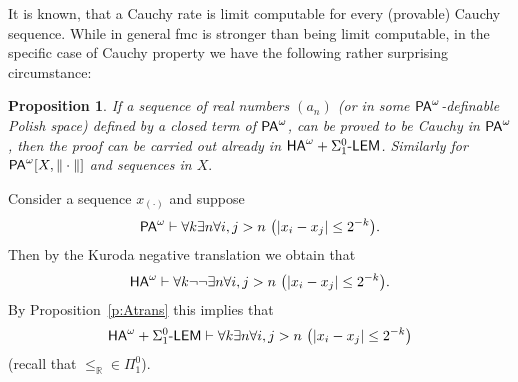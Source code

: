 \documentclass[1p]{elsarticle}
\newcommand{\usftext}[1]{\textsf{\upshape #1}}
\newcommand{\RR}{\ensuremath{\mathbb{R}}}
\newcommand{\ha}{\ensuremath{{\usftext{HA}}^\omega}} %
\newcommand{\pa}{\ensuremath{{\usftext{PA}}^\omega}} %
\newcommand{\LEM}{\ensuremath{\Sigma^0_1\usftext{-LEM}}}
\theoremstyle{plain}
\newtheorem{prop}[thm]{Proposition}
\theoremstyle{definition}
\theoremstyle{remark}
\renewenvironment{proof}[1][]{\noindent{\bf Proof{#1}. }}{\nopagebreak[4]{\hspace*{\fill}
  $\Box$              %
 }{\vspace{2ex}}}
\theoremstyle{definition}
\begin{document}
{It is known, that a Cauchy rate is limit computable for every (provable) 
Cauchy sequence. While in general fmc is stronger than being limit computable, in the specific case of Cauchy property we have the following rather surprising circumstance:
\begin{prop}\label{p:limComp}
If a sequence of real numbers $(a_n)$ (or in some $\pa$-definable Polish 
space) defined by a closed term of 
$\pa$, can be proved to be Cauchy in $\pa$, then the proof can be carried 
out already in $\ha+\LEM$. Similarly for $\pa[X,\|\cdot\|]$ and sequences in 
$X.$
\end{prop}
\begin{proof}
Consider a sequence $x_{(\cdot)}$ and suppose
\[ \pa\vdash \forall k\exists n\forall i,j>n\ \big(| x_i - x_j| \leq 2^{-k}\big). \]
Then by the Kuroda negative translation we obtain that
\[ \ha\vdash \forall k\neg\neg\exists n\forall i,j>n\ \big(| 
x_i - x_j| \leq 2^{-k}\big). \]
By Proposition~\ref{p:Atrans} this implies that
\[ \ha+\LEM\vdash \forall k\exists n\forall i,j>n\ \big(| x_i - x_j| \leq 2^{-k}\big) \] (recall that $\le_{\RR}\in\Pi^0_1$).
\end{proof}



}
\end{document}
